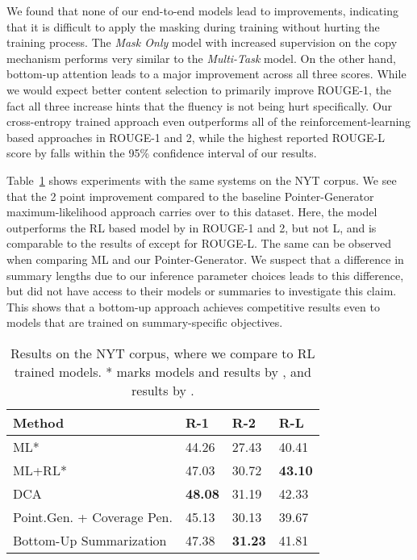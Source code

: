 \documentclass[11pt,a4paper]{article}
\begin{document}
We found that none of our end-to-end models lead to improvements, indicating that it is difficult to apply the masking during training without hurting the training process. The \emph{Mask Only} model with increased supervision on the copy mechanism performs very similar to the \emph{Multi-Task} model. On the other hand, bottom-up attention leads to a major improvement across all three scores. While we would expect better content selection to primarily improve ROUGE-1, the fact all three increase hints that the fluency is not being hurt specifically. Our cross-entropy trained approach even outperforms all of the reinforcement-learning based approaches in ROUGE-1 and 2, while the highest reported ROUGE-L score by \citet{chen2018fast} falls within the 95\% confidence interval of our results.
 
Table~\ref{tab:nytres} shows experiments with the same systems on the NYT corpus. We see that
the 2 point improvement compared to the baseline Pointer-Generator maximum-likelihood approach carries 
over to this dataset. Here, the model outperforms the RL based model by \citet{paulus2017deep} in ROUGE-1 and 2, but not L, and is comparable to the results of \cite{celikyilmaz2018deep} except for ROUGE-L. The same can be observed when comparing ML and our Pointer-Generator. We suspect that a difference in summary lengths due to our inference parameter choices leads to this difference, but did not have access to their models or summaries to investigate this claim. This shows that a bottom-up approach achieves competitive results even to models that are trained on summary-specific objectives. 

\begin{table}[t]
\centering
{}
\begin{tabular}{@{}llll@{}}
\toprule
Method & R-1 & R-2 & R-L \\ \midrule
\small{ML*} & 44.26 & 27.43 & 40.41 \\
\small{ML+RL*} & 47.03 & 30.72 & \textbf{43.10} \\
\small{DCA} & \textbf{48.08} & 31.19 & 42.33 \\
\small{Point.Gen. + Coverage Pen.} & 45.13 & 30.13 & 39.67 \\
\small{Bottom-Up Summarization} & 47.38 & \textbf{31.23} & 41.81 \\ \bottomrule
\end{tabular}
\caption{Results on the NYT corpus, where we compare to RL trained models. * marks models and results by \citet{paulus2017deep}, and  results by \citet{celikyilmaz2018deep}. }
\label{tab:nytres}
\end{table}
\end{document}
